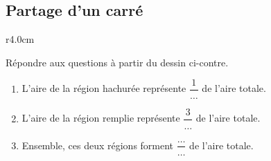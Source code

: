 
\subsection*{Partage d'un carré}

\begin{wrapfigure}[2]{r}{4.0cm}
   \vspace{-1cm}        %
   \centering
   
\end{wrapfigure}

Répondre aux questions à partir du dessin ci-contre.
\begin{enumerate}
    \item
                L'aire de la région hachurée représente \( \dfrac{ 1 }{ \ldots }\) de l'aire totale.
            \item
                L'aire de la région remplie représente \( \dfrac{ 3 }{ \ldots }\) de l'aire totale.
    \item
        Ensemble, ces deux régions forment \( \dfrac{ \ldots }{ \ldots }\) de l'aire totale.
\end{enumerate}
